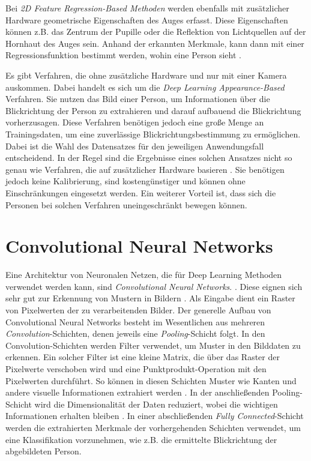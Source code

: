 Bei \textit{2D Feature Regression-Based Methoden} \cite{paper:basics:survey} werden ebenfalls mit zusätzlicher Hardware geometrische Eigenschaften des Auges erfasst. Diese Eigenschaften können z.B. das Zentrum der Pupille oder die Reflektion von Lichtquellen auf der Hornhaut des Auges sein. Anhand der erkannten Merkmale, kann dann mit einer Regressionsfunktion bestimmt werden, wohin eine Person sieht \cite{paper:basics:survey}.

Es gibt Verfahren, die ohne zusätzliche Hardware und nur mit einer Kamera auskommen. Dabei handelt es sich um die \textit{Deep Learning Appearance-Based} \cite{paper:basics:survey} Verfahren. Sie nutzen das Bild einer Person, um Informationen über die Blickrichtung der Person zu extrahieren und darauf aufbauend die Blickrichtung vorherzusagen. Diese Verfahren benötigen jedoch eine große Menge an Trainingsdaten, um eine zuverlässige Blickrichtungsbestimmung zu ermöglichen. Dabei ist die Wahl des Datensatzes für den jeweiligen Anwendungsfall entscheidend. In der Regel sind die Ergebnisse eines solchen Ansatzes nicht so genau wie Verfahren, die auf zusätzlicher Hardware basieren \cite{paper:basics:survey}. Sie benötigen jedoch keine Kalibrierung, sind kostengünstiger und können ohne Einschränkungen eingesetzt werden. Ein weiterer Vorteil ist, dass sich die Personen bei solchen Verfahren uneingeschränkt bewegen können.

\section{Convolutional Neural Networks}

Eine Architektur von Neuronalen Netzen, die für Deep Learning Methoden verwendet werden kann, sind \textit{Convolutional Neural Networks}. \cite{diplom:matthes, paper:cnn}. Diese eignen sich sehr gut zur Erkennung von Mustern in Bildern \cite{diplom:matthes, paper:eth-xgaze, paper:mpiigaze, paper:rt_gene, paper:gaze360}. Als Eingabe dient ein Raster von Pixelwerten der zu verarbeitenden Bilder. Der generelle Aufbau von Convolutional Neural Networks besteht im Wesentlichen aus mehreren \textit{Convolution}-Schichten, denen jeweils eine \textit{Pooling}-Schicht \cite{paper:cnn} folgt. In den Convolution-Schichten werden Filter verwendet, um Muster in den Bilddaten zu erkennen. Ein solcher Filter ist eine kleine Matrix, die über das Raster der Pixelwerte verschoben wird und eine Punktprodukt-Operation mit den Pixelwerten durchführt. So können in diesen Schichten Muster wie Kanten und andere visuelle Informationen extrahiert werden \cite{diplom:matthes, paper:cnn}. In der anschließenden Pooling-Schicht wird die Dimensionalität der Daten reduziert, wobei die wichtigen Informationen erhalten bleiben \cite{paper:cnn}. In einer abschließenden \textit{Fully Connected}-Schicht werden die extrahierten Merkmale der vorhergehenden Schichten verwendet, um eine Klassifikation vorzunehmen, wie z.B. die ermittelte Blickrichtung der abgebildeten Person.

